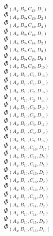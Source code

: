 \documentclass[14pt]{article}
\begin{document}
    $\Phi_{({A}_{4}, {B}_{9}, {C}_{13}, {D}_{1})}$ \\ 
    $\Phi_{({A}_{4}, {B}_{9}, {C}_{13}, {D}_{2})}$ \\ 
    $\Phi_{({A}_{4}, {B}_{9}, {C}_{13}, {D}_{3})}$ \\ 
    $\Phi_{({A}_{4}, {B}_{9}, {C}_{14}, {D}_{1})}$ \\ 
    $\Phi_{({A}_{4}, {B}_{9}, {C}_{14}, {D}_{2})}$ \\ 
    $\Phi_{({A}_{4}, {B}_{9}, {C}_{14}, {D}_{3})}$ \\ 
    $\Phi_{({A}_{4}, {B}_{9}, {C}_{15}, {D}_{9})}$ \\ 
    $\Phi_{({A}_{4}, {B}_{9}, {C}_{15}, {D}_{10})}$ \\ 
    $\Phi_{({A}_{4}, {B}_{10}, {C}_{1}, {D}_{13})}$ \\ 
    $\Phi_{({A}_{4}, {B}_{10}, {C}_{1}, {D}_{14})}$ \\ 
    $\Phi_{({A}_{4}, {B}_{10}, {C}_{2}, {D}_{13})}$ \\ 
    $\Phi_{({A}_{4}, {B}_{10}, {C}_{2}, {D}_{14})}$ \\ 
    $\Phi_{({A}_{4}, {B}_{10}, {C}_{3}, {D}_{13})}$ \\ 
    $\Phi_{({A}_{4}, {B}_{10}, {C}_{3}, {D}_{14})}$ \\ 
    $\Phi_{({A}_{4}, {B}_{10}, {C}_{5}, {D}_{11})}$ \\ 
    $\Phi_{({A}_{4}, {B}_{10}, {C}_{5}, {D}_{12})}$ \\ 
    $\Phi_{({A}_{4}, {B}_{10}, {C}_{9}, {D}_{15})}$ \\ 
    $\Phi_{({A}_{4}, {B}_{10}, {C}_{10}, {D}_{15})}$ \\ 
    $\Phi_{({A}_{4}, {B}_{10}, {C}_{11}, {D}_{5})}$ \\ 
    $\Phi_{({A}_{4}, {B}_{10}, {C}_{12}, {D}_{5})}$ \\ 
    $\Phi_{({A}_{4}, {B}_{10}, {C}_{13}, {D}_{1})}$ \\ 
    $\Phi_{({A}_{4}, {B}_{10}, {C}_{13}, {D}_{2})}$ \\ 
    $\Phi_{({A}_{4}, {B}_{10}, {C}_{13}, {D}_{3})}$ \\ 
    $\Phi_{({A}_{4}, {B}_{10}, {C}_{14}, {D}_{1})}$ \\ 
    $\Phi_{({A}_{4}, {B}_{10}, {C}_{14}, {D}_{2})}$ \\ 
    $\Phi_{({A}_{4}, {B}_{10}, {C}_{14}, {D}_{3})}$ \\ 
    $\Phi_{({A}_{4}, {B}_{10}, {C}_{15}, {D}_{9})}$ \\ 
    $\Phi_{({A}_{4}, {B}_{10}, {C}_{15}, {D}_{10})}$ \\ 
\end{document}

